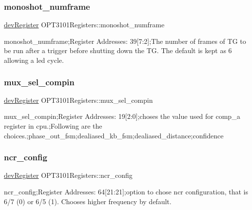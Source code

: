 \subsubsection{\texorpdfstring{monoshot\+\_\+numframe}{monoshot\_numframe}}
{\footnotesize\ttfamily \mbox{\hyperlink{classdev_register}{dev\+Register}} O\+P\+T3101\+Registers\+::monoshot\+\_\+numframe}



monoshot\+\_\+numframe;Register Addresses\+: 39\mbox{[}7\+:2\mbox{]};The number of frames of TG to be run after a trigger before shutting down the TG. The default is kept as 6 allowing a led cycle. 

\mbox{\label{class_o_p_t3101_registers_ab7fb1c397a31af95e2d2248d03bef80e}} 
\subsubsection{\texorpdfstring{mux\+\_\+sel\+\_\+compin}{mux\_sel\_compin}}
{\footnotesize\ttfamily \mbox{\hyperlink{classdev_register}{dev\+Register}} O\+P\+T3101\+Registers\+::mux\+\_\+sel\+\_\+compin}



mux\+\_\+sel\+\_\+compin;Register Addresses\+: 19\mbox{[}2\+:0\mbox{]};choses the value used for comp\+\_\+a register in cpu.;Following are the choices.;phase\+\_\+out\+\_\+fsm;dealiased\+\_\+kb\+\_\+fsm;dealiased\+\_\+distance;confidence 

\mbox{\label{class_o_p_t3101_registers_a161695952966e854642175f92bbd3ae6}} 
\subsubsection{\texorpdfstring{ncr\+\_\+config}{ncr\_config}}
{\footnotesize\ttfamily \mbox{\hyperlink{classdev_register}{dev\+Register}} O\+P\+T3101\+Registers\+::ncr\+\_\+config}



ncr\+\_\+config;Register Addresses\+: 64\mbox{[}21\+:21\mbox{]};option to chose ncr configuration, that is 6/7 (0) or 6/5 (1). Chooses higher frequency by default. 

